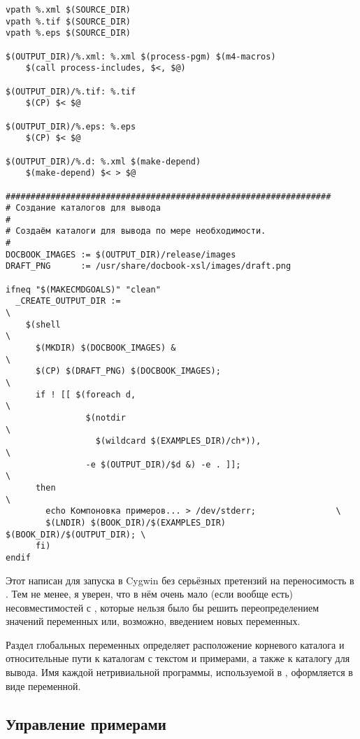 \begin{verbatim}
vpath %.xml $(SOURCE_DIR)
vpath %.tif $(SOURCE_DIR)
vpath %.eps $(SOURCE_DIR)

$(OUTPUT_DIR)/%.xml: %.xml $(process-pgm) $(m4-macros)
    $(call process-includes, $<, $@)

$(OUTPUT_DIR)/%.tif: %.tif
    $(CP) $< $@

$(OUTPUT_DIR)/%.eps: %.eps
    $(CP) $< $@

$(OUTPUT_DIR)/%.d: %.xml $(make-depend)
    $(make-depend) $< > $@

#################################################################
# Создание каталогов для вывода
#
# Создаём каталоги для вывода по мере необходимости.
#
DOCBOOK_IMAGES := $(OUTPUT_DIR)/release/images
DRAFT_PNG      := /usr/share/docbook-xsl/images/draft.png

ifneq "$(MAKECMDGOALS)" "clean"
  _CREATE_OUTPUT_DIR :=                                                 \
    $(shell                                                             \
      $(MKDIR) $(DOCBOOK_IMAGES) &                                      \
      $(CP) $(DRAFT_PNG) $(DOCBOOK_IMAGES);                             \
      if ! [[ $(foreach d,                                              \
                $(notdir                                                \
                  $(wildcard $(EXAMPLES_DIR)/ch*)),                     \
                -e $(OUTPUT_DIR)/$d &) -e . ]];                         \
      then                                                              \
        echo Компоновка примеров... > /dev/stderr;                \
        $(LNDIR) $(BOOK_DIR)/$(EXAMPLES_DIR) $(BOOK_DIR)/$(OUTPUT_DIR); \
      fi)
endif
\end{verbatim}

Этот \Makefile{} написан для запуска в Cygwin без серьёзных претензий
на переносимость в \UNIX{}. Тем не менее, я уверен, что в нём очень
мало (если вообще есть) несовместимостей с \UNIX{}, которые нельзя
было бы решить переопределением значений переменных или, возможно,
введением новых переменных.

Раздел глобальных переменных определяет расположение корневого
каталога и относительные пути к каталогам с текстом и примерами, а
также к каталогу для вывода. Имя каждой нетривиальной программы,
используемой в , оформляется в виде переменной.

\subsection{Управление примерами}

